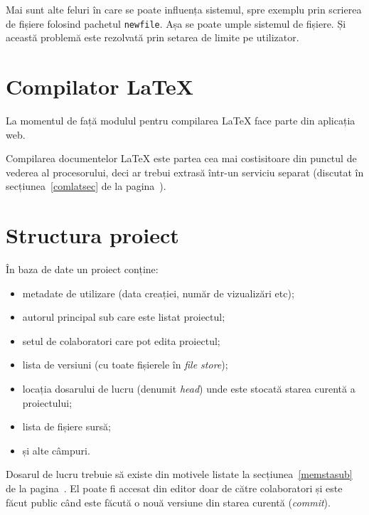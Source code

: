 \documentclass[a4wide,12pt]{report}
\newcommand{\eng}[1]{\emph{#1}} %
\newcommand{\cod}[1]{\texttt{#1}}
\begin{document}
Mai sunt alte feluri în care se poate influența sistemul, spre exemplu prin
scrierea de fișiere folosind pachetul \cod{newfile}. Așa se poate umple sistemul
de fișiere. Și această problemă este rezolvată prin setarea de limite pe
utilizator.

\section{Compilator \LaTeX}

La momentul de față modulul pentru compilarea \LaTeX{} face parte din aplicația
web.

Compilarea documentelor \LaTeX{} este partea cea mai costisitoare din punctul de
vederea al procesorului, deci ar trebui extrasă într-un serviciu separat
(discutat în secțiunea~\ref{comlatsec} de la pagina~\pageref{comlatsec}).

\section{Structura proiect}

În baza de date un proiect conține:

\begin{itemize}

\item metadate de utilizare (data creației, număr de vizualizări etc);

\item autorul principal sub care este listat proiectul;

\item setul de colaboratori care pot edita proiectul;

\item lista de versiuni (cu toate fișierele în \eng{file store});

\item locația dosarului de lucru (denumit \eng{head}) unde este stocată starea
curentă a proiectului;

\item lista de fișiere sursă;

\item și alte câmpuri.

\end{itemize}

Dosarul de lucru trebuie să existe din motivele listate la
secțiunea~\ref{memstasub} de la pagina~\pageref{memstasub}. El poate fi accesat
din editor doar de către colaboratori și este făcut public când este făcută o
nouă versiune din starea curentă (\eng{commit}).
\end{document}
